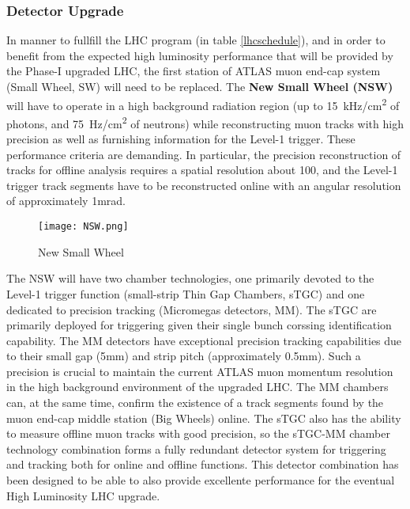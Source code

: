 \subsubsection{Detector Upgrade}

In manner to fullfill the LHC program (in table \ref{lhcschedule}), and in order to benefit from the expected high luminosity
performance that will be provided by the Phase-I upgraded LHC, the first station of ATLAS muon end-cap system (Small
Wheel, SW) will need to be replaced.  The {\bf New Small Wheel (NSW)} will have to operate in a high background radiation
region (up to \SI{15}{kHz/cm^2} of photons, and \SI{75}{Hz/cm^2} of neutrons) while reconstructing muon tracks with high precision as well as furnishing information for
the Level-1 trigger. These performance criteria are demanding. In particular, the precision reconstruction of tracks for
offline analysis requires a spatial resolution about 100, and the Level-1 trigger track segments have to be
reconstructed online with an angular resolution of approximately 1mrad. \par
\begin{figure}[ht]
		\centering
		\texttt{[image: NSW.png]}
		\caption{New Small Wheel}\label{fig:nsw}
\end{figure}

The NSW will have two chamber technologies, one primarily devoted to the Level-1 trigger function (small-strip Thin Gap
Chambers, sTGC) and one dedicated to precision tracking (Micromegas detectors, MM). The sTGC are primarily deployed for
triggering given their single bunch corssing identification capability. The MM detectors have exceptional precision
tracking capabilities due to their small gap (\unit{5}{mm}) and strip pitch (approximately 0.5\si{mm}). Such a precision is
crucial to maintain the current ATLAS muon momentum resolution in the high background environment of the upgraded LHC.
The MM chambers can, at the same time, confirm the existence of a track segments found by the muon end-cap middle
station (Big Wheels) online. The sTGC also has the ability to measure offline muon tracks with good precision, so the
sTGC-MM chamber technology combination forms a fully redundant detector system for triggering and tracking both for
online and offline functions. This detector combination has been designed to be able to also provide excellente
performance for the eventual High Luminosity LHC upgrade.\par 



